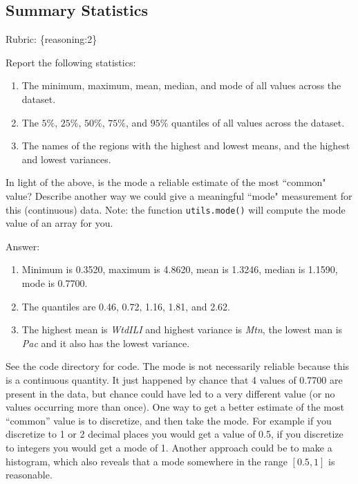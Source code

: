 \documentclass{article}
\def\ans#1{\par\gre{Answer: #1}}
\def\answer#1{\ans{#1}}
\def\rubric#1{\gre{Rubric: \{#1\}}}{}
\def\blu#1{{\color{blu}#1}}
\def\gre#1{{\color{gre}#1}}
\def\enum#1{\begin{enumerate}#1\end{enumerate}}
\begin{document}
\subsection{Summary Statistics}
\rubric{reasoning:2}

\blu{Report the following statistics}:
\enum{
\item The minimum, maximum, mean, median, and mode of all values across the dataset.
\item The $5\%$, $25\%$, $50\%$, $75\%$, and $95\%$ quantiles of all values across the dataset.
\item The names of the regions with the highest and lowest means, and the highest and lowest variances.%
}
In light of the above, \blu{is the mode a reliable estimate of the most ``common" value? Describe another way we could give a meaningful ``mode" measurement for this (continuous) data.} Note: the function \texttt{utils.mode()} will compute the mode value of an array for you.


\answer{
\begin{enumerate}
\item Minimum is 0.3520, maximum is 4.8620, mean is 1.3246, median is 1.1590, mode is 0.7700.
\item The quantiles are 0.46, 0.72, 1.16, 1.81, and 2.62.
\item The highest mean is \emph{WtdILI} and highest variance is \emph{Mtn}, the lowest man is \emph{Pac} and it also has the lowest variance.
\end{enumerate}
See the code directory for code. The mode is not necessarily reliable because this is a
continuous quantity. It just happened by chance that 4 values of 0.7700 are present
in the data, but chance could have led to a very different value (or no values
occurring more than once). One way to get a better estimate of the most
``common'' value is to discretize, and then take the mode.
For example if you discretize to 1 or 2 decimal places you would get a
value of 0.5, if you discretize to integers you would get a mode of 1.
Another approach could be to make a histogram, which also reveals that
a mode somewhere in the range $[0.5,1]$ is reasonable.
}
\end{document}

